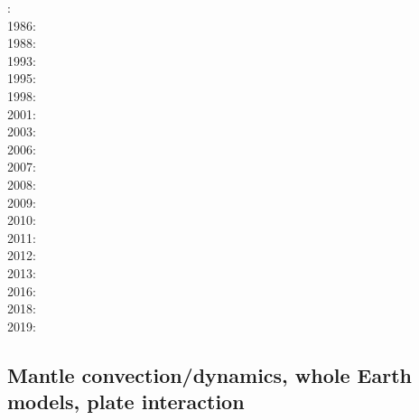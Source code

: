 : \cite{scst84}\cite{mcke84}\\
1986: \cite{scst86}\\
1988: \cite{scot88}\\
1993: \cite{spie93}\\
1995: \cite{bisc95}\\
1998: \cite{rabg98}\\
2001: \cite{bers01}\\
2003: \cite{beri03}\\
2006: \cite{omma06}\\
2007: \cite{srrb07}\\
2008: \cite{hets08}\cite{hest08}\\
2009: \cite{bavi09}\\
2010: \cite{baiv10}\\
2011: \cite{baiv11}\cite{zhgy11}\cite{zhgh11}\\
2012: \cite{yatd12}\\
2013: \cite{kemk13}\\
2016: \cite{keka16}\\
2018: \cite{lorg18}\\
2019: \cite{dagg19}


\subsection*{Mantle convection/dynamics, whole Earth models, plate interaction}


